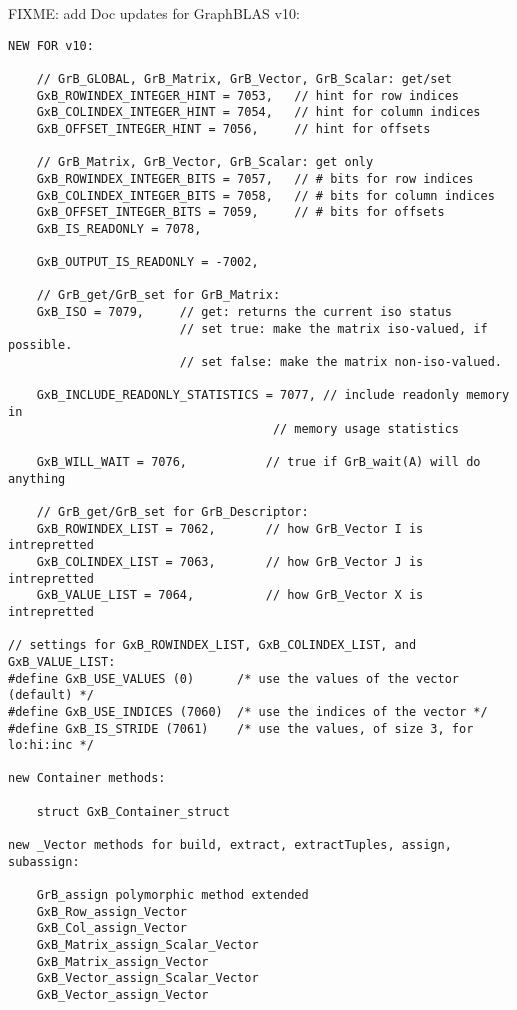 
\newpage
\begin{note}
FIXME: add Doc updates for GraphBLAS v10:   %
\end{note}

\begin{verbatim}
NEW FOR v10:

    // GrB_GLOBAL, GrB_Matrix, GrB_Vector, GrB_Scalar: get/set
    GxB_ROWINDEX_INTEGER_HINT = 7053,   // hint for row indices
    GxB_COLINDEX_INTEGER_HINT = 7054,   // hint for column indices
    GxB_OFFSET_INTEGER_HINT = 7056,     // hint for offsets

    // GrB_Matrix, GrB_Vector, GrB_Scalar: get only
    GxB_ROWINDEX_INTEGER_BITS = 7057,   // # bits for row indices
    GxB_COLINDEX_INTEGER_BITS = 7058,   // # bits for column indices
    GxB_OFFSET_INTEGER_BITS = 7059,     // # bits for offsets
    GxB_IS_READONLY = 7078,

    GxB_OUTPUT_IS_READONLY = -7002,

    // GrB_get/GrB_set for GrB_Matrix:
    GxB_ISO = 7079,     // get: returns the current iso status
                        // set true: make the matrix iso-valued, if possible.
                        // set false: make the matrix non-iso-valued.

    GxB_INCLUDE_READONLY_STATISTICS = 7077, // include readonly memory in
                                     // memory usage statistics

    GxB_WILL_WAIT = 7076,           // true if GrB_wait(A) will do anything

    // GrB_get/GrB_set for GrB_Descriptor:
    GxB_ROWINDEX_LIST = 7062,       // how GrB_Vector I is intrepretted
    GxB_COLINDEX_LIST = 7063,       // how GrB_Vector J is intrepretted
    GxB_VALUE_LIST = 7064,          // how GrB_Vector X is intrepretted

// settings for GxB_ROWINDEX_LIST, GxB_COLINDEX_LIST, and GxB_VALUE_LIST:
#define GxB_USE_VALUES (0)      /* use the values of the vector (default) */
#define GxB_USE_INDICES (7060)  /* use the indices of the vector */
#define GxB_IS_STRIDE (7061)    /* use the values, of size 3, for lo:hi:inc */

new Container methods:

    struct GxB_Container_struct

new _Vector methods for build, extract, extractTuples, assign, subassign:

    GrB_assign polymorphic method extended
    GxB_Row_assign_Vector
    GxB_Col_assign_Vector
    GxB_Matrix_assign_Scalar_Vector
    GxB_Matrix_assign_Vector
    GxB_Vector_assign_Scalar_Vector
    GxB_Vector_assign_Vector


\end{verbatim}

